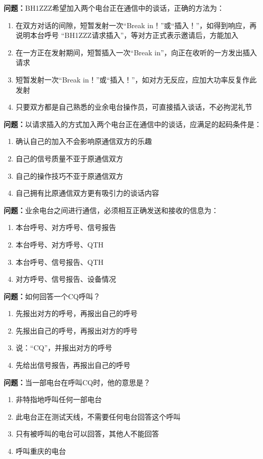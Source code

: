 \textbf{问题：}BH1ZZZ希望加入两个电台正在通信中的谈话，正确的方法为：
\begin{enumerate}[label=\Alph*), leftmargin=1cm]
	\item 在双方对话的间隙，短暂发射一次“Break in！”或“插入！”，如得到响应，再说明本台呼号 “BH1ZZZ请求插入”，等对方正式表示邀请后，方能加入
	\item 在一方正在发射期间，短暂插入一次“Break in”，向正在收听的一方发出插入请求
	\item 短暂发射一次“Break in！”或“插入！”，如对方无反应，应加大功率反复作此发射
	\item 只要双方都是自己熟悉的业余电台操作员，可直接插入谈话，不必拘泥礼节
\end{enumerate}

\textbf{问题：}以请求插入的方式加入两个电台正在通信中的谈话，应满足的起码条件是：
\begin{enumerate}[label=\Alph*), leftmargin=1cm]
	\item 确认自己的加入不会影响原通信双方的乐趣
	\item 自己的信号质量不亚于原通信双方
	\item 自己的操作技巧不亚于原通信双方
	\item 自己拥有比原通信双方更有吸引力的谈话内容
\end{enumerate}

\textbf{问题：}业余电台之间进行通信，必须相互正确发送和接收的信息为：
\begin{enumerate}[label=\Alph*), leftmargin=1cm]
	\item 本台呼号、对方呼号、信号报告
	\item 本台呼号、对方呼号、QTH
	\item 本台呼号、信号报告、QTH
	\item 对方呼号、信号报告、设备情况
\end{enumerate}

\textbf{问题：}如何回答一个CQ呼叫？
\begin{enumerate}[label=\Alph*), leftmargin=1cm]
	\item 先报出对方的呼号，再报出自己的呼号
	\item 先报出自己的呼号，再报出对方的呼号
	\item 说：“CQ”，并报出对方的呼号
	\item 先给出信号报告，再报出自己的呼号
\end{enumerate}

\textbf{问题：}当一部电台在呼叫CQ时，他的意思是？
\begin{enumerate}[label=\Alph*), leftmargin=1cm]
	\item 非特指地呼叫任何一部电台
	\item 此电台正在测试天线，不需要任何电台回答这个呼叫
	\item 只有被呼叫的电台可以回答，其他人不能回答
	\item 呼叫重庆的电台
\end{enumerate}

